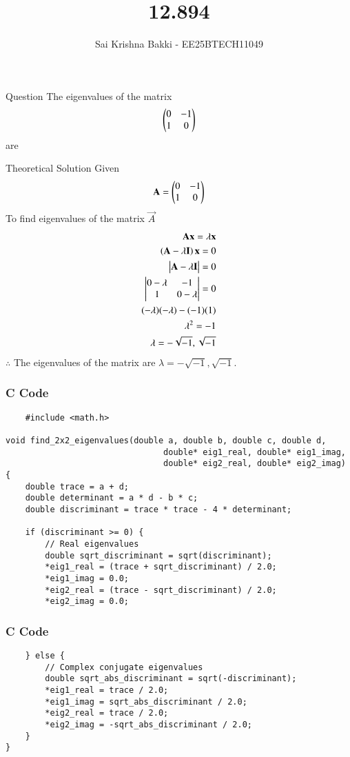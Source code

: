 \documentclass{beamer}
\title %
{12.894}
\date{}
\author %
{Sai Krishna Bakki - EE25BTECH11049}
\begin{document}
\frame{\titlepage}
\begin{frame}{Question}
The eigenvalues of the matrix 
\begin{align*}
\begin{pmatrix}0&-1\\1&0\end{pmatrix}
\end{align*}
are
\end{frame}
\begin{frame}{Theoretical Solution}
Given\\
\begin{align}
    \mathbf{A}=\begin{pmatrix}0&-1\\1&0\end{pmatrix}
\end{align}
To find eigenvalues of the matrix $\vec{A}$
\begin{align}
    \mathbf{A}\mathbf{x}=\lambda\mathbf{x}\\
    \left(\mathbf{A}-\lambda\mathbf{I}\right)\mathbf{x}=0\\
    \begin{vmatrix}\mathbf{A}-\lambda\mathbf{I}\end{vmatrix}=0\\
    \begin{vmatrix}0-\lambda&-1\\1&0-\lambda\end{vmatrix}=0\\
    (-\lambda)(-\lambda)-(-1)(1)\\
    \lambda^2=-1\\
    \lambda=-\sqrt{-1},\sqrt{-1}
    \end{align}
    $\therefore$ The eigenvalues of the matrix are $\lambda=-\sqrt{-1},\sqrt{-1}$.
\end{frame}
\begin{frame}[fragile]
\frametitle{C Code}
\begin{lstlisting}
    #include <math.h>

void find_2x2_eigenvalues(double a, double b, double c, double d,
                                double* eig1_real, double* eig1_imag,
                                double* eig2_real, double* eig2_imag) {
    double trace = a + d;
    double determinant = a * d - b * c;
    double discriminant = trace * trace - 4 * determinant;

    if (discriminant >= 0) {
        // Real eigenvalues
        double sqrt_discriminant = sqrt(discriminant);
        *eig1_real = (trace + sqrt_discriminant) / 2.0;
        *eig1_imag = 0.0;
        *eig2_real = (trace - sqrt_discriminant) / 2.0;
        *eig2_imag = 0.0;
\end{lstlisting}
\end{frame}
\begin{frame}[fragile]
\frametitle{C Code}
\begin{lstlisting}
    } else {
        // Complex conjugate eigenvalues
        double sqrt_abs_discriminant = sqrt(-discriminant);
        *eig1_real = trace / 2.0;
        *eig1_imag = sqrt_abs_discriminant / 2.0;
        *eig2_real = trace / 2.0;
        *eig2_imag = -sqrt_abs_discriminant / 2.0;
    }
}
\end{lstlisting}
\end{frame}
\end{document}
